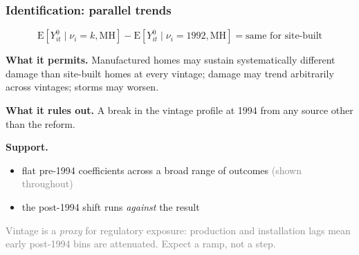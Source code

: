 \documentclass[11pt,xcolor={dvipsnames},hyperref={pdftex,pdfpagemode=UseNone,hidelinks,pdfdisplaydoctitle=true},usepdftitle=false,aspectratio=169]{beamer}
\newcommand{\gc}[1]{{\footnotesize\textcolor{gray}{#1}}}
\begin{document}
\begin{frame}[t]
    \frametitle{Identification: parallel  trends}

    $$\text{E}\left[Y^0_{it} \mid \nu_i = k, \text{MH}\right] - \text{E}\left[Y^0_{it} \mid \nu_i = 1992, \text{MH}\right] = \text{same for site-built}$$

    \vspace{0.5em}
    \pause

    \textbf{What it permits.} Manufactured homes may sustain systematically different damage than site-built homes at every vintage; damage may trend arbitrarily across vintages; storms may worsen.

    \vspace{0.5em}
    \pause

    \textbf{What it rules out.} A  break in the vintage profile at 1994 from any source other than the reform.

    \vspace{0.5em}
    \pause

    \textbf{Support.}
    \begin{itemize}\setlength{\itemsep}{0.25em}
        \item flat pre-1994 coefficients across a broad range of outcomes \gc{(shown throughout)}
        \item the post-1994  shift runs \emph{against} the result \hfill \hyperlink{frame:composition}{}
    \end{itemize}

    \vspace{0.6em}
    \pause

    \gc{Vintage is a \emph{proxy} for regulatory exposure: production and installation lags mean early post-1994 bins are attenuated. Expect a ramp, not a step.}

\end{frame}




\begin{frame}
\end{frame}
\end{document}
